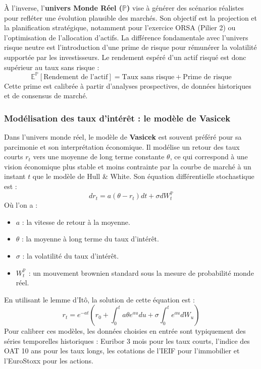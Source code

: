 À l'inverse, l'\textbf{univers Monde Réel ($\mathbb{P}$)} vise à générer des scénarios réalistes pour refléter une évolution plausible des marchés. Son objectif est la projection et la planification stratégique, notamment pour l'exercice ORSA (Pilier 2) ou l'optimisation de l'allocation d'actifs. La différence fondamentale avec l'univers risque neutre est l'introduction d'une prime de risque pour rémunérer la volatilité supportée par les investisseurs. Le rendement espéré d'un actif risqué est donc supérieur au taux sans risque :
\begin{equation}
    \mathbb{E}^{\mathbb{P}}[\text{Rendement de l'actif}] = \text{Taux sans risque} + \text{Prime de risque}
\end{equation}
Cette prime est calibrée à partir d'analyses prospectives, de données historiques et de consensus de marché.

\subsubsection{Modélisation des taux d'intérêt : le modèle de Vasicek}
Dans l'univers monde réel, le modèle de \textbf{Vasicek} est souvent préféré pour sa parcimonie et son interprétation économique. Il modélise un retour des taux courts $r_t$ vers une moyenne de long terme constante $\theta$, ce qui correspond à une vision économique plus stable et moins contrainte par la courbe de marché à un instant $t$ que le modèle de Hull \& White. Son équation différentielle stochastique est :
\begin{equation}
    dr_t = a(\theta - r_t)dt + \sigma dW^{\mathbb{P}}_t
\end{equation}
Où l'on a :
\begin{itemize}
    \item $a$ : la vitesse de retour à la moyenne.
    \item $\theta$ : la moyenne à long terme du taux d’intérêt.
    \item $\sigma$ : la volatilité du taux d’intérêt.
    \item $W^{\mathbb{P}}_t$ : un mouvement brownien standard sous la mesure de probabilité monde réel.
\end{itemize}
En utilisant le lemme d'Itô, la solution de cette équation est :
\begin{equation}
    r_t = e^{-at} \left( r_0 + \int_0^t a\theta e^{au}du + \sigma \int_0^t e^{au}dW_u \right)
\end{equation}
Pour calibrer ces modèles, les données choisies en entrée sont typiquement des séries temporelles historiques : Euribor 3 mois pour les taux courts, l'indice des OAT 10 ans pour les taux longs, les cotations de l'IEIF pour l'immobilier et l'EuroStoxx pour les actions.


